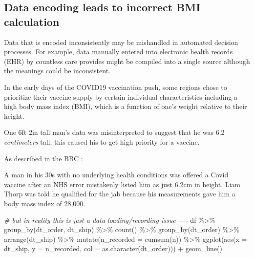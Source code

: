 \documentclass[
]{krantz}
\makeatletter
\newenvironment{Shaded}{\begin{snugshade}}{\end{snugshade}}
\newcommand{\AttributeTok}[1]{\textcolor[rgb]{0.61,0.61,0.61}{#1}}
\newcommand{\CommentTok}[1]{\textcolor[rgb]{0.37,0.37,0.37}{\textit{#1}}}
\newcommand{\FunctionTok}[1]{\textcolor[rgb]{0,0,0}{#1}}
\newcommand{\NormalTok}[1]{#1}
\newcommand{\SpecialCharTok}[1]{\textcolor[rgb]{0,0,0}{#1}}
\renewenvironment{quote}{\begin{VF}}{\end{VF}}
\newenvironment{kframe}{%
\medskip{}
\setlength{\fboxsep}{.8em}
 \def\at@end@of@kframe{}%
 \ifinner\ifhmode%
  \def\at@end@of@kframe{\end{minipage}}%
  \begin{minipage}{\columnwidth}%
 \fi\fi%
 \def\FrameCommand##1{\hskip\@totalleftmargin \hskip-\fboxsep
 \colorbox{shadecolor}{##1}\hskip-\fboxsep
     \hskip-\linewidth \hskip-\@totalleftmargin \hskip\columnwidth}%
 \MakeFramed {\advance\hsize-\width
   \@totalleftmargin\z@ \linewidth\hsize
   \@setminipage}}%
 {\par\unskip\endMakeFramed%
 \at@end@of@kframe}
\renewenvironment{Shaded}{\begin{kframe}}{\end{kframe}}
\makeatother
\begin{document}
\hypertarget{data-encoding-leads-to-incorrect-bmi-calculation}{%
\subsection{Data encoding leads to incorrect BMI calculation}\label{data-encoding-leads-to-incorrect-bmi-calculation}}

Data that is encoded inconsistently may be mishandled in automated decision processes.
For example, data manually entered into electronic health records (EHR) by countless care provides might be compiled into a single source although the meanings could be inconsistent.

In the early days of the COVID19 vaccination push, some regions chose to prioritize their vaccine supply by certain individual characteristics including a high body mass index (BMI), which is a function of one's weight relative to their height.

One 6ft 2in tall man's data was misinterpreted to suggest that he was 6.2 \emph{centimeters} tall; this caused his to get high priority for a vaccine.

As described in the BBC \citep{bbc_north_west_2021}:

\begin{quote}
A man in his 30s with no underlying health conditions was offered a Covid vaccine after an NHS error mistakenly listed him as just 6.2cm in height. Liam Thorp was told he qualified for the jab because his measurements gave him a body mass index of 28,000.
\end{quote}

\begin{Shaded}
\begin{Highlighting}[]
\CommentTok{\# but in reality this is just a data loading/recording issue {-}{-}{-}{-}}
\NormalTok{df }\SpecialCharTok{\%\textgreater{}\%}
  \FunctionTok{group\_by}\NormalTok{(dt\_order, dt\_ship) }\SpecialCharTok{\%\textgreater{}\%}
  \FunctionTok{count}\NormalTok{() }\SpecialCharTok{\%\textgreater{}\%}
  \FunctionTok{group\_by}\NormalTok{(dt\_order) }\SpecialCharTok{\%\textgreater{}\%}
  \FunctionTok{arrange}\NormalTok{(dt\_ship) }\SpecialCharTok{\%\textgreater{}\%}
  \FunctionTok{mutate}\NormalTok{(}\AttributeTok{n\_recorded =} \FunctionTok{cumsum}\NormalTok{(n)) }\SpecialCharTok{\%\textgreater{}\%}
  \FunctionTok{ggplot}\NormalTok{(}\FunctionTok{aes}\NormalTok{(}\AttributeTok{x =}\NormalTok{ dt\_ship, }\AttributeTok{y =}\NormalTok{ n\_recorded, }\AttributeTok{col =} \FunctionTok{as.character}\NormalTok{(dt\_order))) }\SpecialCharTok{+} \FunctionTok{geom\_line}\NormalTok{()}
\end{Highlighting}
\end{Shaded}
\end{document}
